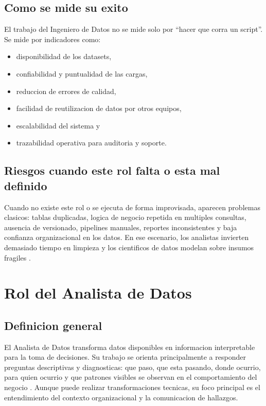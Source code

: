\documentclass[12pt]{article}
\begin{document}
\subsection{Como se mide su exito}
El trabajo del Ingeniero de Datos no se mide solo por ``hacer que corra un script''. Se mide por indicadores como:
\begin{itemize}[leftmargin=*]
\item disponibilidad de los datasets,
\item confiabilidad y puntualidad de las cargas,
\item reduccion de errores de calidad,
\item facilidad de reutilizacion de datos por otros equipos,
\item escalabilidad del sistema y
\item trazabilidad operativa para auditoria y soporte.
\end{itemize}

\subsection{Riesgos cuando este rol falta o esta mal definido}
Cuando no existe este rol o se ejecuta de forma improvisada, aparecen problemas clasicos: tablas duplicadas, logica de negocio repetida en multiples consultas, ausencia de versionado, pipelines manuales, reportes inconsistentes y baja confianza organizacional en los datos. En ese escenario, los analistas invierten demasiado tiempo en limpieza y los cientificos de datos modelan sobre insumos fragiles \cite{dama_dmbok,kimball_dw_toolkit}.

\section{Rol del Analista de Datos}
\subsection{Definicion general}
El Analista de Datos transforma datos disponibles en informacion interpretable para la toma de decisiones. Su trabajo se orienta principalmente a responder preguntas descriptivas y diagnosticas: que paso, que esta pasando, donde ocurrio, para quien ocurrio y que patrones visibles se observan en el comportamiento del negocio \cite{aws_analytics}. Aunque puede realizar transformaciones tecnicas, su foco principal es el entendimiento del contexto organizacional y la comunicacion de hallazgos.
\end{document}
